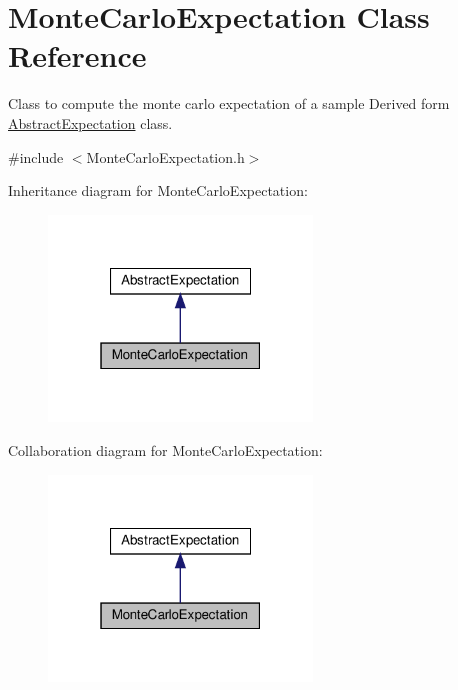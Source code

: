 \hypertarget{classMonteCarloExpectation}{}\section{Monte\+Carlo\+Expectation Class Reference}
\label{classMonteCarloExpectation}


Class to compute the monte carlo expectation of a sample Derived form \hyperlink{classAbstractExpectation}{Abstract\+Expectation} class.  




{\ttfamily \#include $<$Monte\+Carlo\+Expectation.\+h$>$}



Inheritance diagram for Monte\+Carlo\+Expectation\+:\nopagebreak
\begin{figure}[H]
\begin{center}
\leavevmode
\includegraphics[width=199pt]{classMonteCarloExpectation__inherit__graph}
\end{center}
\end{figure}


Collaboration diagram for Monte\+Carlo\+Expectation\+:\nopagebreak
\begin{figure}[H]
\begin{center}
\leavevmode
\includegraphics[width=199pt]{classMonteCarloExpectation__coll__graph}
\end{center}
\end{figure}

